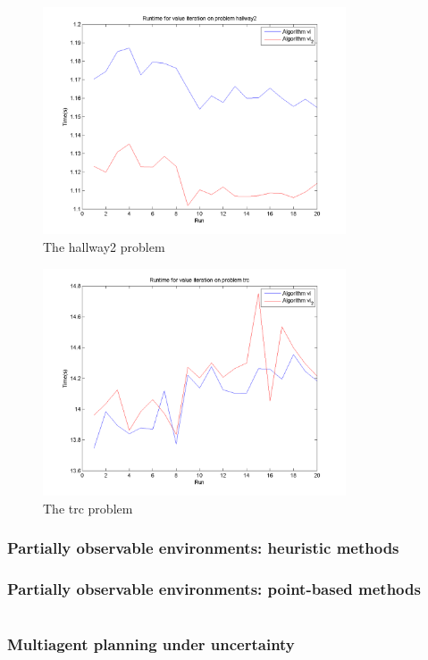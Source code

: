 \documentclass[10pt,a4paper]{article}
\begin{document}
\begin{figure}
\vspace{-20pt}
\hspace{-30pt}
\centering
\includegraphics[width=0.8\textwidth]{Timings/hallway2/timings_vi.png}
\caption{The hallway2 problem}
\hspace{-30pt}
\label{fig:vi_hallway2}
\vspace{-20pt}
\end{figure}
        
\begin{figure}
\vspace{-20pt}
\hspace{-30pt}
\centering
\includegraphics[width=0.8\textwidth]{Timings/trc/timings_vi.png}
\hspace{-30pt}
\caption{The trc problem}
\label{fig:vi_trc}
\vspace{-20pt}
\end{figure}



\section{Partially observable environments: heuristic methods}

\section{Partially observable environments: point-based methods}

\part{}
\section{Multiagent planning under uncertainty}
\end{document}
